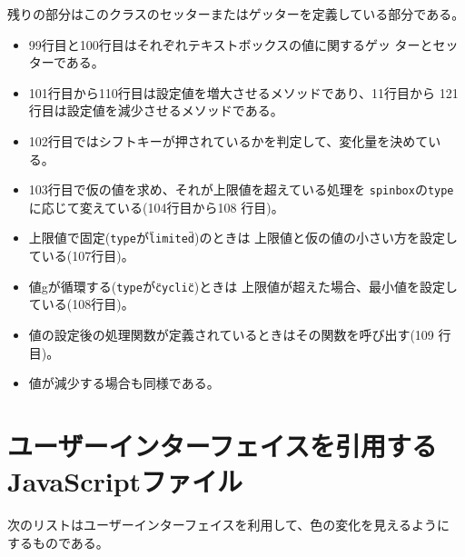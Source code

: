 残りの部分はこのクラスのセッターまたはゲッターを定義している部分である。
\begin{itemize}
 \item 99行目と100行目はそれぞれテキストボックスの値に関するゲッ
       ターとセッターである。
 \item 101行目から110行目は設定値を増大させるメソッドであり、11行目から
       121行目は設定値を減少させるメソッドである。
 \item 102行目ではシフトキーが押されているかを判定して、変化量を決めてい
       る。
 \item 103行目で仮の値を求め、それが上限値を超えている処理を
       \texttt{spinbox}の\texttt{type}に応じて変えている(104行目から108
       行目)。
 \item  上限値で固定(\texttt{type}が\texttt{\"limited\"})のときは
       上限値と仮の値の小さい方を設定している(107行目)。
 \item 値gが循環する(\texttt{type}が\texttt{\"cyclic\"})ときは
       上限値が超えた場合、最小値を設定している(108行目)。
 \item 値の設定後の処理関数が定義されているときはその関数を呼び出す(109
       行目)。
 \item 値が減少する場合も同様である。
\end{itemize}
 \section{ユーザーインターフェイスを引用するJavaScriptファイル}
 次のリストはユーザーインターフェイスを利用して、色の変化を見えるように
 するものである。
 